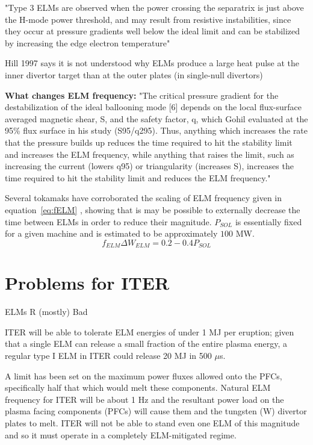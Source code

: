 \documentclass[12pt]{article}  %
\newcommand{\citep}[1]{\cite{#1}}
\begin{document}
"Type 3 ELMs are observed when the power crossing the separatrix is just above the H-mode power threshold, and may result from resistive instabilities, since they occur at pressure gradients well below the ideal limit and can be stabilized by increasing the edge electron temperature"\citep{Hill1997}

Hill 1997\cite{Hill1997} says it is not understood why ELMs produce a large heat pulse at the inner divertor target than at the outer plates (in single-null divertors)

\textbf{What changes ELM frequency:}
"The critical pressure gradient for the destabilization of the ideal ballooning mode [6] depends on the local flux-surface averaged magnetic shear, S, and the safety factor, q, which Gohil evaluated at the 95\% flux surface in his study (S95/q295). Thus, anything which increases the rate that the pressure builds up reduces the time required to hit the stability limit and increases the ELM frequency, while anything that raises the limit, such as increasing the current (lowers q95) or triangularity (increases S), increases the time required to hit the stability limit and reduces the ELM frequency."\cite{Hill1997}

Several tokamaks have corroborated the scaling of ELM frequency given in equation~\ref{eq:fELM} \cite{Leonard1999}\cite{Loarte2002}, showing that is may be possible to externally decrease the time between ELMs in order to reduce their magnitude. $P_{SOL}$ is essentially fixed for a given machine and is estimated to be approximately $100$ MW.\cite{Eich2013}
\begin{equation}\label{eq:fELM}
f_{ELM}\Delta W_{ELM} = 0.2-0.4 P_{SOL}
\end{equation}

\section{Problems for ITER}\label{sec:Problems}
ELMs R (mostly) Bad \cite{Connor2008}

ITER will be able to tolerate ELM energies of under 1 MJ per eruption; given that a single ELM can release a small fraction of the entire plasma energy, a regular type I ELM in ITER could release 20 MJ in 500 $\mu$s\cite{KirkFF}. 

A limit has been set on the maximum power fluxes allowed onto the PFCs, specifically half that which would melt these components.\cite{Loarte2014a} Natural ELM frequency for ITER will be about 1 Hz and the resultant power load on the plasma facing components (PFCs) will cause them and the tungsten (W) divertor plates to melt\cite{Federici2003}. ITER will not be able to stand even one ELM of this magnitude and so it must operate in a completely ELM-mitigated regime.\cite{KirkFF}
\end{document}
